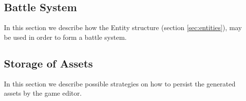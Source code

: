 \subsection{Battle System}

In this section we describe how the Entity structure (section
\ref{sec:entities}), may be used in order to form a battle system.

\subsection{Storage of Assets}

In this section we describe possible strategies on how to persist the generated
assets by the game editor.
